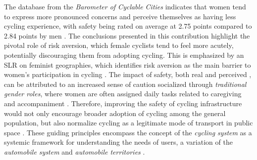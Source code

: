 \begin{refsegment}
The database from the \textsl{Barometer of Cyclable Cities} indicates that women tend to express more pronounced concerns and perceive themselves as having less cycling experience, with safety being rated on average at 2.75 points compared to 2.84 points by men \textcolor{blue}{\autocites[25]{vermeulen_barometre_2022}[37]{caduc_analyse_2022}}. The conclusions presented in this contribution highlight the pivotal role of risk aversion, which female cyclists tend to feel more acutely, potentially discouraging them from adopting cycling. This is emphasized by an \acrfull{SLR} on feminist geographies, which identifies risk aversion as the main barrier to women's participation in cycling \textcolor{blue}{\autocite[4]{ravensbergen_toward_2019}}. The impact of safety, both real and perceived \textcolor{blue}{\autocite[57]{garrard_promoting_2008}}, can be attributed to an increased sense of caution socialized through \textsl{traditional gender roles}, where women are often assigned daily tasks related to caregiving and accompaniment \textcolor{blue}{\autocite[5]{prati_gender_2019}}. Therefore, improving the safety of cycling infrastructure would not only encourage broader adoption of cycling among the general population, but also normalize cycling as a legitimate mode of transport in public space \textcolor{blue}{\autocite[40]{aldred_does_2016}}. These guiding principles encompass the concept of the \textsl{cycling system} \textcolor{blue}{\autocites[169]{heran_retour_2015}[]{heran_systeme_2001}} as a systemic framework for understanding the needs of users, a variation of the \textsl{automobile system} \textcolor{blue}{\autocite{hall_impact_1988}} and \textsl{automobile territories} \textcolor{blue}{\autocite[13]{dupuy_dependance_1999}}.%


\end{refsegment}

